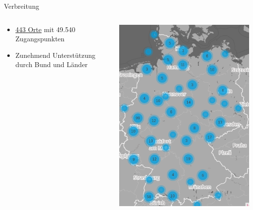 \documentclass[t]{beamer}
\begin{document}
  \begin{frame}{Verbreitung}
    \begin{columns}
      \begin{column}{0.6\textwidth}
  \begin{itemize}
    \item \href{http://freifunk.net/wie-mache-ich-mit/community-finden/}{443 Orte} mit 49.540 Zugangspunkten
    \item Zunehmend Unterstützung durch Bund und Länder
  \end{itemize}
      \end{column}
      \begin{column}{0.4\textwidth}
  \begin{center}
    \includegraphics[width=\textwidth]{Bilder/community-map-2017-04-24}
  \end{center}
      \end{column}
    \end{columns}
  \end{frame}
  
\end{document}
